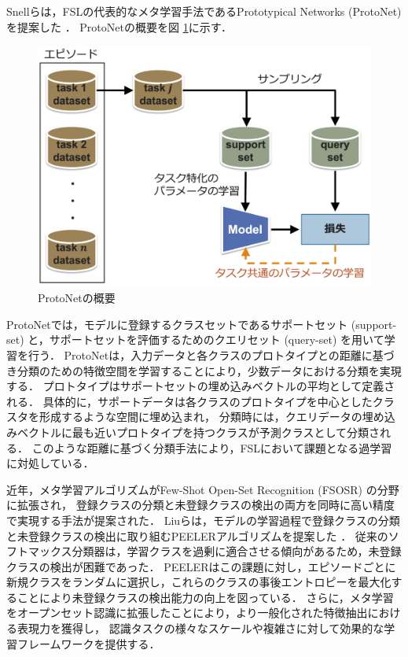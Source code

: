 Snellらは，FSLの代表的なメタ学習手法であるPrototypical Networks (ProtoNet) を提案した \cite{protonet}．
ProtoNetの概要を図 \ref{fig:protonet}に示す．
% 
\begin{figure}[tbp]
  \centering
  \includegraphics[width=0.7\linewidth, keepaspectratio]{image/protonet.png}
  \caption{ProtoNetの概要}
  \label{fig:protonet}
\end{figure}
% 
ProtoNetでは，モデルに登録するクラスセットであるサポートセット (support-set) と，サポートセットを評価するためのクエリセット (query-set) を用いて学習を行う．
ProtoNetは，入力データと各クラスのプロトタイプとの距離に基づき分類のための特徴空間を学習することにより，少数データにおける分類を実現する．
プロトタイプはサポートセットの埋め込みベクトルの平均として定義される．
具体的に，サポートデータは各クラスのプロトタイプを中心としたクラスタを形成するような空間に埋め込まれ，
分類時には，クエリデータの埋め込みベクトルに最も近いプロトタイプを持つクラスが予測クラスとして分類される．
このような距離に基づく分類手法により，FSLにおいて課題となる過学習に対処している．

近年，メタ学習アルゴリズムがFew-Shot Open-Set Recognition (FSOSR) の分野に拡張され，
登録クラスの分類と未登録クラスの検出の両方を同時に高い精度で実現する手法が提案された．
Liuらは，モデルの学習過程で登録クラスの分類と未登録クラスの検出に取り組むPEELERアルゴリズムを提案した \cite{peeler}．
従来のソフトマックス分類器は，学習クラスを過剰に適合させる傾向があるため，未登録クラスの検出が困難であった．
PEELERはこの課題に対し，エピソードごとに新規クラスをランダムに選択し，これらのクラスの事後エントロピーを最大化することにより未登録クラスの検出能力の向上を図っている．
さらに，メタ学習をオープンセット認識に拡張したことにより，より一般化された特徴抽出における表現力を獲得し，
認識タスクの様々なスケールや複雑さに対して効果的な学習フレームワークを提供する．

